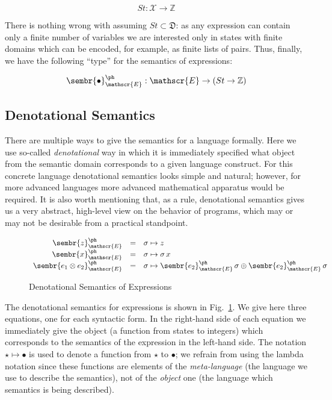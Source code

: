 \[
St : \mathscr{X} \to \mathbb{Z}
\]

There is nothing wrong with assuming $St\subset\mathfrak{D}$: as any expression can contain only a finite number of variables we are interested only in
states with finite domains which can be encoded, for example, as finite lists of pairs. Thus, finally, we have the following ``type'' for the semantics
of expressions:

\[
\sembr{\bullet}^\ph_\mathscr{E}:\mathscr{E}\to(St\to\mathbb{Z})
\]

\subsection{Denotational Semantics}

There are multiple ways to give the semantics for a language formally. Here we use so-called \emph{denotational} way in which it is immediately
specified what object from the semantic domain corresponds to a given language construct. For this concrete language denotational semantics
looks simple and natural; however, for more advanced languages more advanced mathematical apparatus would be required. It is also worth mentioning that,
as a rule, denotational semantics gives us a very abstract, high-level view on the behavior of programs, which may or may not be desirable from a
practical standpoint.


\begin{figure}[t]
\[
\begin{array}{rcl}
  \sembr{z}^\ph_\mathscr{E} & = & \sigma \mapsto z \\
  \sembr{x}^\ph_\mathscr{E} & = & \sigma \mapsto \sigma\,x \\
  \sembr{e_1\otimes e_2}^\ph_\mathscr{E} & = & \sigma \mapsto \sembr{e_2}^\ph_\mathscr{E}\,\sigma\oplus\sembr{e_2}^\ph_\mathscr{E}\,\sigma
\end{array}
\]
\caption{Denotational Semantics of Expressions}
\label{se-denot}
\end{figure}


The denotational semantics for expressions is shown in Fig.~\ref{se-denot}.
We give here three equations, one for each syntactic form. In the right-hand side of each equation we immediately
give the object (a function from states to integers) which corresponds to the semantics of the expression in the
left-hand side. The notation $\star \mapsto \bullet$ is used to denote a function from $\star$ to $\bullet$; we refrain from
using the lambda notation since these functions are elements of the \emph{meta-language} (the language we use to describe the
semantics), not of the \emph{object} one (the language which semantics is being described).

